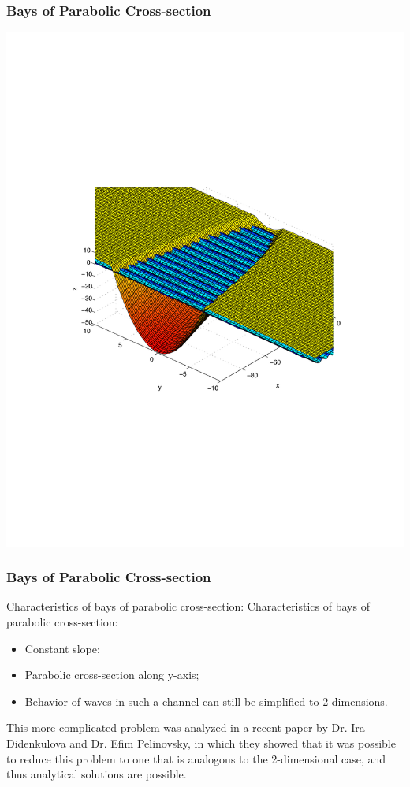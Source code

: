 \documentclass[xcolor=dvipsnames]{beamer}
\begin{document}
\begin{frame}
\frametitle{Bays of Parabolic Cross-section}
\includegraphics[width=\linewidth]{parabolicbay.pdf}
\end{frame}

\begin{frame}
\frametitle{Bays of Parabolic Cross-section}
Characteristics of bays of parabolic cross-section:
Characteristics of bays of parabolic cross-section:
\begin{itemize}
\item Constant slope;
\item Parabolic cross-section along y-axis;
\item Behavior of waves in such a channel can still be simplified to 2 dimensions.
\end{itemize}
This more complicated problem was analyzed in a recent paper by Dr. Ira Didenkulova and Dr. Efim Pelinovsky, in which they showed that it was possible to reduce this problem to one that is analogous to the 2-dimensional case, and thus analytical solutions are possible.
\end{frame}
\end{document}
